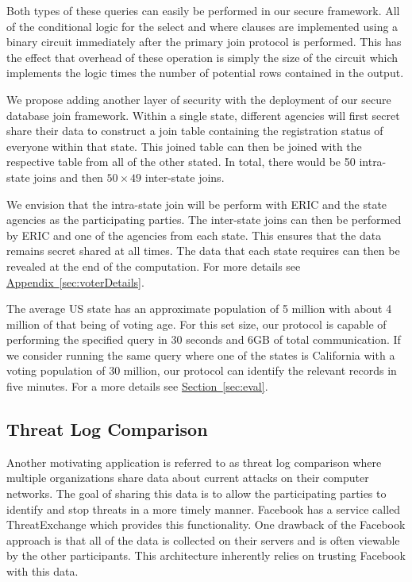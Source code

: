 \documentclass[11pt,letterpaper]{article}
\newcommand{\namedref}[2]{\hyperref[#2]{#1~\ref*{#2}}}
\newcommand{\sectionref}[1]{\namedref{Section}{#1}}
\newcommand{\appendixref}[1]{\namedref{Appendix}{#1}}
\begin{document}
Both types of these queries can easily be performed in our secure framework. All of the conditional logic for the select and where clauses are implemented using a binary circuit immediately after the primary join protocol is performed. This has the effect that overhead of these operation is simply the size of the circuit which implements the logic times the number of potential rows contained in the output.  
\else

We propose adding another layer of security with the deployment of our secure database join framework. Within a single state, different agencies will first secret share their data to construct a join table containing the registration status of everyone within that state. This joined table can then be joined with the respective table from all of the other stated. In total, there would be 50 intra-state joins and then $50\times49$ inter-state joins. 

We envision that the intra-state join will be perform with ERIC and the state agencies as the participating parties. The inter-state joins can then be performed by ERIC and one of the agencies from each state. This ensures that the data remains secret shared at all times. The data that each state requires can then be revealed at the end of the computation. For more details see \appendixref{sec:voterDetails}.

\fi


The average US state has an approximate population of 5 million with about 4 million of that being of voting age. For this set size, our protocol is capable of performing the specified query in 30 seconds and 6GB of total communication. If we consider running the same query where one of the states is California with a voting population of 30 million, our protocol can identify the relevant records in five minutes. For a more details see \sectionref{sec:eval}.
 
\subsection{Threat Log Comparison}\label{sec:threatlog}

Another motivating application is referred to as threat log comparison where multiple organizations share data about current attacks on their computer networks. The goal of sharing this data is to allow the participating parties to identify and stop threats in a more timely manner. Facebook has a service called ThreatExchange\cite{threat} which provides this functionality. One drawback of the Facebook approach is that all of the data is collected on their servers and is often viewable by the other participants. This architecture inherently relies on trusting Facebook with this data. 
\end{document}
